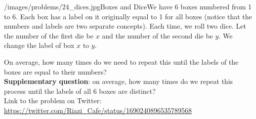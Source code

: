 \begin{problem}{/images/problems/24_dices.jpg}{Boxes and Dice}We have 6 boxes numbered from 1 to 6. Each box has a label on it originally equal to 1 for all boxes (notice that the numbers and labels are two separate concepts). Each time, we roll two dice. Let the number of the first die be $x$ and the number of the second die be $y$. We change the label of box $x$ to $y$.

On average, how many times do we need to repeat this until the labels of the boxes are equal to their numbers?\\[0.2cm]

\textbf{Supplementary question}: on average, how many times do we repeat this process until the labels of all 6 boxes are distinct?\\[0.2cm]

Link to the problem on Twitter:  \url{https://twitter.com/Riazi_Cafe/status/1690240896535789568}\end{problem}
